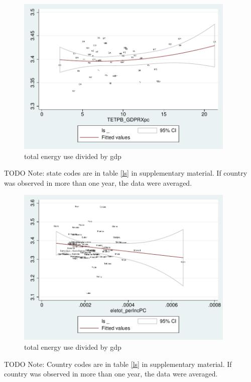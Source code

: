 \documentclass[10pt, letterpaper]{article}
\begin{document}
\begin{spacing}{1.4}
\begin{figure}[H]
 \includegraphics[height=3in]{graphsAndTables/lfTETPBgdpLS.pdf}\centering
\caption{total energy use divided by gdp}\label{}
\end{figure}
{\scriptsize TODO Note: state codes are in table \ref{ls} in supplementary
  material. If country was observed in more than one year, the data were averaged.}

\begin{figure}[H]
 \includegraphics[height=3in]{graphsAndTables/caEleTotGdp.pdf}\centering
\caption{total energy use divided by gdp}\label{}
\end{figure}
{\scriptsize TODO Note: Country codes are in table \ref{ls} in supplementary
  material. If country was observed in more than one year, the data were averaged.}




\end{spacing}
\end{document}

